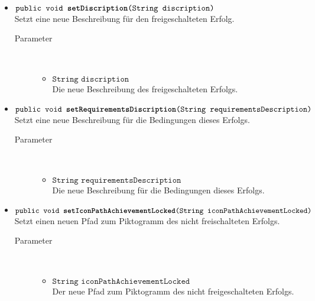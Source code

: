 \begin{description}
\begin{itemize}
				\item $\texttt{public void \textbf{setDiscription}(String discription)}$ \\ Setzt eine neue Beschreibung für den freigeschalteten Erfolg.
				\begin{description}
					\item[Parameter] \hfill \\
					\vspace{-.8cm}
					\begin{itemize}
						\item $\texttt{String discription}$ \\ Die neue Beschreibung des freigeschalteten Erfolgs.
					\end{itemize}
				\end{description}
				
				\item $\texttt{public void \textbf{setRequirementsDiscription}(String requirementsDescription)}$ \\ Setzt eine neue Beschreibung für die Bedingungen dieses Erfolgs.
				\begin{description}
					\item[Parameter] \hfill \\
					\vspace{-.8cm}
					\begin{itemize}
						\item $\texttt{String requirementsDescription}$ \\ Die neue Beschreibung für die Bedingungen dieses Erfolgs.
					\end{itemize}
				\end{description}
		
			\item $\texttt{public void \textbf{setIconPathAchievementLocked}(String iconPathAchievementLocked)}$ \\ Setzt einen neuen Pfad zum Piktogramm des nicht freischalteten Erfolgs.
				\begin{description}
					\item[Parameter] \hfill \\
					\vspace{-.8cm}
					\begin{itemize}
						\item $\texttt{String iconPathAchievementLocked}$ \\ Der neue Pfad zum Piktogramm des nicht freigeschalteten Erfolgs.
					\end{itemize}
				\end{description}
			

\end{itemize}
\end{description}
